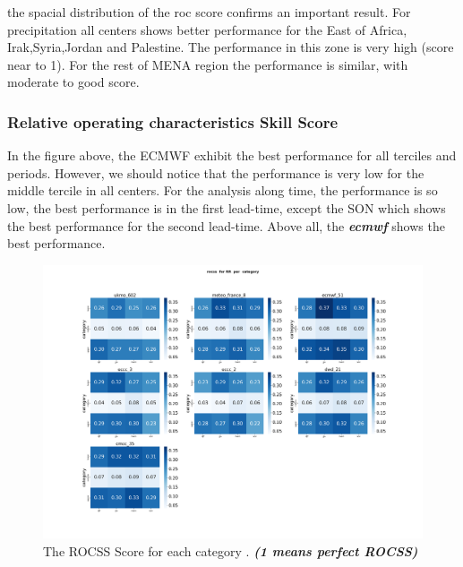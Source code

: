 the spacial distribution of the roc score confirms an important result. For precipitation all centers shows better performance for the East of Africa, Irak,Syria,Jordan and Palestine. The performance in this zone is very high (score near to 1). For the rest of MENA region the performance is similar, with moderate to good score.

																
\subsubsection{Relative operating characteristics Skill Score}

In the figure above, the ECMWF exhibit the best performance for all terciles and periods. However, we should notice that the performance is very low for the middle tercile in all centers. For the analysis along time, the performance is so low, the best performance is in the first lead-time, except the SON which shows the best performance for the second lead-time. Above all, the \textbf{\textit{ecmwf}} shows the best performance.

\begin{figure}[H]
    \centering
    \includegraphics[scale=0.25]{plots/prob/rocss/rocss_RR_category.png}
    \caption{The ROCSS Score for each category  . \textbf{\textit{(1 means perfect ROCSS)}}}
\end{figure}


